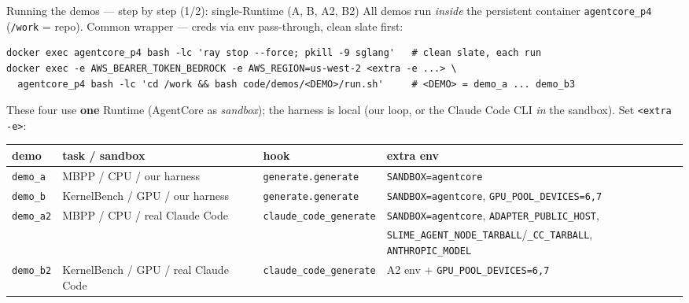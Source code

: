 \documentclass[aspectratio=169]{beamer}
\begin{document}
\begin{frame}[fragile]{Running the demos --- step by step (1/2): single-Runtime (A, B, A2, B2)}
  \footnotesize All demos run \emph{inside} the persistent container \texttt{agentcore\_p4}
  (\texttt{/work} = repo). Common wrapper --- creds via env pass-through, clean slate first:
\begin{lstlisting}[basicstyle=\ttfamily\scriptsize]
docker exec agentcore_p4 bash -lc 'ray stop --force; pkill -9 sglang'   # clean slate, each run
docker exec -e AWS_BEARER_TOKEN_BEDROCK -e AWS_REGION=us-west-2 <extra -e ...> \
  agentcore_p4 bash -lc 'cd /work && bash code/demos/<DEMO>/run.sh'     # <DEMO> = demo_a ... demo_b3
\end{lstlisting}
  \vspace{-0.2em}\scriptsize These four use \textbf{one} Runtime (AgentCore as \emph{sandbox}); the harness is local (our loop, or the Claude Code CLI \emph{in} the sandbox). Set \texttt{<extra -e>}:
  \vspace{0.15em}
  \begin{center}\scriptsize
  \begin{tabular}{@{}llll@{}}
    \toprule
    \textbf{demo} & \textbf{task / sandbox} & \textbf{hook} & \textbf{extra env} \\
    \midrule
    \texttt{demo\_a}  & MBPP / CPU / our harness & \texttt{generate.generate} & \texttt{SANDBOX=agentcore} \\
    \texttt{demo\_b}  & KernelBench / GPU / our harness & \texttt{generate.generate} & \texttt{SANDBOX=agentcore}, \texttt{GPU\_POOL\_DEVICES=6,7} \\
    \texttt{demo\_a2} & MBPP / CPU / real Claude Code & \texttt{claude\_code\_generate} & \texttt{SANDBOX=agentcore}, \texttt{ADAPTER\_PUBLIC\_HOST}, \\
                      &                              &                             & \texttt{SLIME\_AGENT\_NODE\_TARBALL}/\texttt{\_CC\_TARBALL}, \texttt{ANTHROPIC\_MODEL} \\
    \texttt{demo\_b2} & KernelBench / GPU / real Claude Code & \texttt{claude\_code\_generate} & A2 env $+$ \texttt{GPU\_POOL\_DEVICES=6,7} \\
    \bottomrule
  \end{tabular}
  \end{center}
\end{frame}
\end{document}
